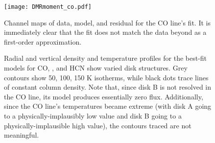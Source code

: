 \begin{figure}%
  \hspace*{\fill}%
  \texttt{[image: DMRmoment\_co.pdf]}\hfill%
  \hspace*{\fill}%
  \caption{Channel maps of data, model, and residual for the CO line's fit. It is immediately clear that the fit does not match the data beyond as a first-order approximation.}
  \label{fig:co_chanmaps}
\end{figure}





\begin{figure}%
  \centering
    \hspace*{\fill}%
    \vfill%
    \vfill%
    \hspace*{\fill}%
    \caption{Radial and vertical density and temperature profiles for the best-fit models for CO, \hco, and HCN show varied disk structures. Grey contours show 50, 100, 150 K isotherms, while black dots trace lines of constant column density. Note that, since disk B is not resolved in the CO line, its model produces essentially zero flux. Additionally, since the CO line's temperatures became extreme (with disk A going to a physically-implausibly low value and disk B going to a physically-implausible high value), the contours traced are not meaningful.}
    \label{fig:bf_disk_strs}
\end{figure}

